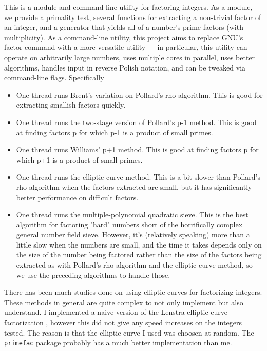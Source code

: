 \begin{displayquote}
	This is a module and command-line utility for factoring integers. As a module, we provide a primality test, several functions 
	for extracting a non-trivial factor of an integer, and a generator that yields all of a number’s prime factors (with multiplicity). 
	As a command-line utility, this project aims to replace GNU’s factor command with a more versatile utility — in particular, 
	this utility can operate on arbitrarily large numbers, uses multiple cores in parallel, uses better algorithms, handles input 
	in reverse Polish notation, and can be tweaked via command-line flags. Specifically
%
	\begin{itemize}
	    \item One thread runs Brent’s variation on Pollard’s rho algorithm. This is good for extracting smallish factors quickly.
	    \item One thread runs the two-stage version of Pollard’s p-1 method. This is good at finding factors p for which p-1 is a 
	    	  product of small primes.
	    \item One thread runs Williams’ p+1 method. This is good at finding factors p for which p+1 is a product of small primes.
	    \item One thread runs the elliptic curve method. This is a bit slower than Pollard’s rho algorithm when the factors 
	    	  extracted are small, but it has significantly better performance on difficult factors.
	    \item One thread runs the multiple-polynomial quadratic sieve. This is the best algorithm for factoring "hard" numbers 
	    	  short of the horrifically complex general number field sieve. However, it’s (relatively speaking) more than a little 
	    	  slow when the numbers are small, and the time it takes depends only on the size of the number being factored rather 
	    	  than the size of the factors being extracted as with Pollard’s rho algorithm and the elliptic curve method, so we use 
	    	  the preceding algorithms to handle those.
	\end{itemize}
%
\end{displayquote}

There has been much studies done on using elliptic curves for factorizing integers. These methods in general are quite complex to not only
implement but also understand. I implemented a naive version of the Lenstra elliptic curve factorization \cite{Lenstra}, however
this did not give any speed increases on the integers tested. The reason is that the elliptic curve I used was choosen at random. 
The \verb|primefac| package probably has a much better implementation than me.


